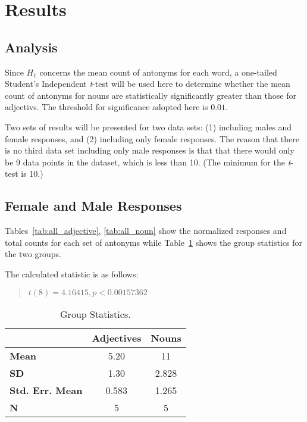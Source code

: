 \section {Results}
\label{results}
\subsection {Analysis} 
Since $H_{1}$ concerns the mean count of antonyms for each word, a one-tailed Student's Independent \textit{t}-test will be used here to determine whether the mean count of antonyms for nouns are statistically significantly greater than those for adjectivs.  The threshold for significance adopted here is $0.01$.  

Two sets of results will be presented for two data sets: (1) including males and female responses, and (2) including only female responses.  The reason that there is no third data set including only male responses is that that there would only be 9 data points in the dataset, which is less than 10.  (The minimum for the \textit{t}-test is 10.)

\subsection{Female and Male Responses}
Tables~\ref{tab:all_adjective}, \ref{tab:all_noun} show the normalized responses and total counts for each set of antonyms while Table~\ref{tab:all_group_stats} shows the group statistics for the two groups.




The calculated statistic is as follows:
	\begin{quote}
		$t(8)=4.16415, p < 0.00157362$
	\end{quote}

\begin{table}
	\begin{center}
		\begin{tabular}{|l|c|c|} \hline
									& \textbf{Adjectives} 	& \textbf{Nouns}  \\ \hline \hline
			\textbf{Mean} 			& 5.20					& 11	\\
			\textbf{SD} 			& 1.30					& 2.828	\\
			\textbf{Std. Err. Mean} & 0.583					& 1.265	\\
			\textbf{N} 				& 5						& 5		\\
			\hline
		\end{tabular}
	\end{center}
	\caption {Group Statistics.}
	\label{tab:all_group_stats}
\end{table}


